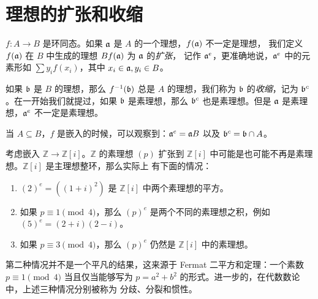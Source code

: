 \section{理想的扩张和收缩}

$f:A\to B$ 是环同态。如果 $\mathfrak{a}$ 是 $A$ 的一个理想，$f(\mathfrak{a})$ 不一定是理想，
我们定义 $f(\mathfrak{a})$ 在 $B$ 中生成的理想 $Bf(\mathfrak{a})$ 为 $\mathfrak{a}$ 的\emph{扩张}，
记作 $\mathfrak{a}^e$，更准确地说，$\mathfrak{a}^e$ 中的元素形如 $\sum y_if(x_i)$，其中
$x_i\in\mathfrak{a},y_i\in B$。

如果 $\mathfrak{b}$ 是 $B$ 的理想，那么 $f^{-1}(\mathfrak{b})$ 总是 $A$ 的理想，我们称为
$\mathfrak{b}$ 的\emph{收缩}，记为 $\mathfrak{b}^c$。在一开始我们就提过，如果 $\mathfrak{b}$
是素理想，那么 $\mathfrak{b}^c$ 也是素理想。但是 $\mathfrak{a}$ 是素理想，$\mathfrak{a}^e$ 不一定是素理想。

当 $A\subseteq B$，$f$ 是嵌入的时候，可以观察到：$\mathfrak{a}^e=\mathfrak{a}B$ 以及
$\mathfrak{b}^c=\mathfrak{b}\cap A$。

\begin{example}
  考虑嵌入 $\mathbb{Z}\to\mathbb{Z}[i]$。$\mathbb{Z}$ 的素理想 $(p)$ 扩张到
    $\mathbb{Z}[i]$ 中可能是也可能不再是素理想。$\mathbb{Z}[i]$ 是主理想整环，那么实际上
    有下面的情况：
    \begin{enumerate}
      \item $(2)^e=((1+i)^2)$ 是 $\mathbb{Z}[i]$ 中两个素理想的平方。
      \item 如果 $p\equiv 1\pmod{4}$，那么 $(p)^e$ 是两个不同的素理想之积，例如
      $(5)^e=(2+i)(2-i)$。
      \item 如果 $p\equiv 3\pmod{4}$，那么 $(p)^e$ 仍然是 $\mathbb{Z}[i]$ 中的素理想。
    \end{enumerate}
    第二种情况并不是一个平凡的结果，这来源于 Fermat 二平方和定理：一个素数 $p\equiv 1\pmod{4}$
    当且仅当能够写为 $p=a^2+b^2$ 的形式。进一步的，在代数数论中，上述三种情况分别被称为
    分歧、分裂和惯性。
\end{example}

